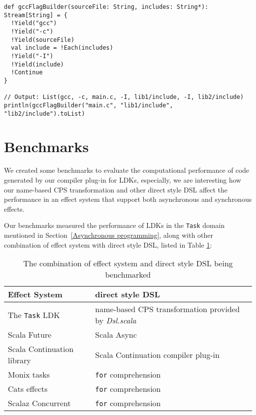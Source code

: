 \begin{lstlisting}[caption={Build a command-line by using generator and collection comprehension together},label={gccFlagBuilder}]
def gccFlagBuilder(sourceFile: String, includes: String*): Stream[String] = {
  !Yield("gcc")
  !Yield("-c")
  !Yield(sourceFile)
  val include = !Each(includes)
  !Yield("-I")
  !Yield(include)
  !Continue
}

// Output: List(gcc, -c, main.c, -I, lib1/include, -I, lib2/include)
println(gccFlagBuilder("main.c", "lib1/include", "lib2/include").toList)
\end{lstlisting}

\section{Benchmarks}\label{Benchmarks}

We created some benchmarks to evaluate the computational performance of code generated by our compiler plug-in for LDKs, especially, we are interesting how our name-based CPS transformation and other direct style DSL affect the performance in an effect system that support both asynchronous and synchronous effects.

Our benchmarks measured the performance of LDKs in the \lstinline{Task} domain mentioned in Section~\ref{Asynchronous programming}, along with other combination of effect system with direct style DSL, listed in Table \ref{combination}:

\begin{table}[htbp]
  \begin{tabular}{l|l}
    Effect System & direct style DSL \\
    \hline
    The \texttt{Task} LDK & name-based CPS transformation provided by \textit{Dsl.scala} \\
    Scala Future \cite{haller2012sip} & Scala Async \cite{haller2013sip} \\
    Scala Continuation library \cite{rompf2009implementing} & Scala Continuation compiler plug-in \\
    Monix tasks \cite{nedelcu2017monix} & \texttt{for} comprehension \\
    Cats effects \cite{typelevel2017cats} & \texttt{for} comprehension \\
    Scalaz Concurrent \cite{kenji2017scalaz} & \texttt{for} comprehension \\
  \end{tabular}
  \caption{The combination of effect system and direct style DSL being benchmarked}
  \label{combination}
\end{table}

